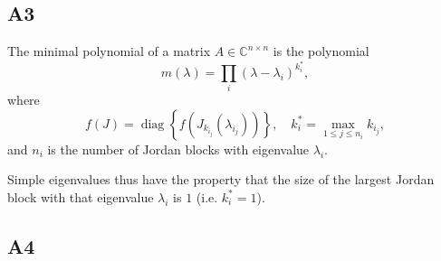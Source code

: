 \documentclass[11pt]{article}
\DeclareMathOperator{\diag}{diag}
\newcommand{\complex}{\mathbb{C}} %
\begin{document}
\subsection*{A3}
The minimal polynomial of a matrix \(A \in \complex^{n \times n}\) is the polynomial
\[
m(\lambda) = \prod_i (\lambda - \lambda_i)^{k_i^*},
\]
where
\[
f(J) = \diag \left\{f\left(J_{k_{i_j}}(\lambda_{i_j})\right)\right\}, \quad k_i^* = \max_{1 \leqslant j \leqslant n_i} k_{i_j},
\]
and \(n_i\) is the number of Jordan blocks with eigenvalue \(\lambda_i\).

Simple eigenvalues thus have the property that the size of the largest Jordan block with that eigenvalue \(\lambda_i\) is \(1\) (i.e. \(k_i^* = 1\)).

\subsection*{A4}
\end{document}
